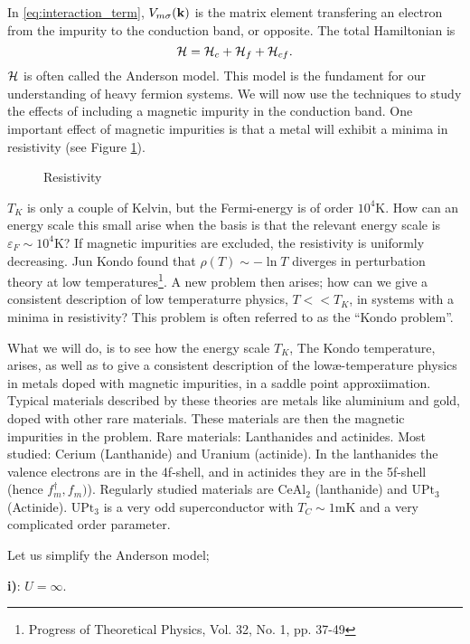 In \eqref{eq:interaction_term}, $V_{m\sigma}(\vb k) $ is the matrix element transfering an electron from the impurity to the conduction band, or opposite. 
The total Hamiltonian is
\begin{equation}
	\mathcal{H} = \mathcal{H}_c + \mathcal{H}_f + \mathcal{H}_{cf}.
\end{equation}
$\mathcal{H}$ is often called the Anderson model. This model is the fundament for our understanding of heavy fermion systems. We will now use the techniques to study the effects of including a magnetic impurity in the conduction band. 
One important effect of magnetic impurities is that a metal will exhibit a minima in resistivity (see Figure \ref{fig:resistivity}).
\begin{figure}
	\centering
	
	\caption{Resistivity}
	\label{fig:resistivity}
\end{figure}
$T_K$ is only a couple of Kelvin, but the Fermi-energy is of order $10^4\mathrm{K}$. How can an energy scale this small arise when the basis is that the relevant energy scale is $\varepsilon_F \sim 10^4\mathrm{K}$? If magnetic impurities are excluded, the resistivity is uniformly decreasing. Jun Kondo found that $\rho(T) \sim -\ln T$ diverges in perturbation theory at low temperatures\footnote{Progress of Theoretical Physics, Vol. 32, No. 1, pp. 37-49}. A new problem then arises; how can we give a consistent description of low temperaturre physics, $T<<T_K$, in systems with a minima in resistivity? This problem is often referred to as the ``Kondo problem''. 

What we will do, is to see how the energy scale $T_K$, The Kondo temperature, arises, as well as to give a consistent description of the lowæ-temperature physics in metals doped with magnetic impurities, in a saddle point approxiimation.
Typical materials described by these theories are metals like aluminium and gold, doped with other rare materials. These materials are then the magnetic impurities in the problem. Rare materials: Lanthanides and actinides. Most studied: Cerium (Lanthanide) and Uranium (actinide). In the lanthanides the valence electrons are in the 4f-shell, and in actinides they are in the 5f-shell (hence $f_m^\dagger, f_m)$). Regularly studied materials are $\mathrm{CeAl_2}$ (lanthanide) and $\mathrm{UPt_3}$ (Actinide). $\mathrm{UPt_3}$ is a very odd superconductor with $T_C \sim 1\mathrm{mK}$ and a very complicated order parameter.  

Let us simplify the Anderson model;

\textbf{i)}: $U = \infty$.

